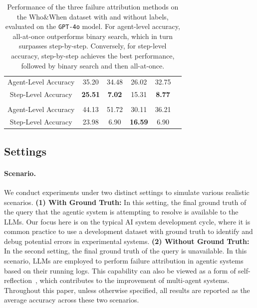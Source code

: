 \begin{table}[!t]
{\begin{tabular}{cccccc}
\multicolumn{1}{c|}{Agent-Level Accuracy}               & \multicolumn{1}{c}{35.20} & 34.48  & \multicolumn{1}{c}{26.02} & 32.75                 \\
\multicolumn{1}{c|}{Step-Level Accuracy}                & \multicolumn{1}{c}{\cellcolor{gray!0}  \textbf{25.51}} & \cellcolor{gray!0}  \textbf{7.02}    & \multicolumn{1}{c}{15.31} & \cellcolor{gray!0}  \textbf{8.77}                  \\
\hline
\rowcolor{gray!50}  \multicolumn{5}{c}{Binary Search}                                                                                                                                                                                                         \\\hline
\multicolumn{1}{c|}{Agent-Level Accuracy}               & \multicolumn{1}{c}{44.13} & 51.72   & \multicolumn{1}{c}{30.11} & 36.21                \\
\multicolumn{1}{c|}{Step-Level Accuracy}                & \multicolumn{1}{c}{23.98} & 6.90     & \multicolumn{1}{c}{\cellcolor{gray!0}  \textbf{16.59}} & 6.90                  \\
\bottomrule[1.5pt]
\end{tabular}
}
\caption{Performance of the three failure attribution methods on the Who\&When dataset with and without labels, evaluated on the \texttt{GPT-4o} model. 
For agent-level accuracy, all-at-once outperforms binary search, which in turn surpasses step-by-step. 
Conversely, for step-level accuracy, step-by-step achieves the best performance, followed by binary search and then all-at-once.}
\label{tab:main_results}
\end{table}

\subsection{Settings}

\paragraph{Scenario.} 
We conduct experiments under two distinct settings to simulate various realistic scenarios.
\textbf{(1) With Ground Truth:} 
In this setting, the final ground truth of the query that the agentic system is attempting to resolve is available to the LLMs. 
Our focus here is on the typical AI system development cycle, where it is common practice to use a development dataset with ground truth to identify and debug potential errors in experimental systems. 
\textbf{(2) Without Ground Truth:} 
In the second setting, the final ground truth of the query is unavailable. In this scenario, LLMs are employed to perform failure attribution in agentic systems based on their running logs. This capability can also be viewed as a form of self-reflection~\citep{shinn2024reflexion, huang2023large}, which contributes to the improvement of multi-agent systems.
Throughout this paper, unless otherwise specified, all results are reported as the average accuracy across these two scenarios.

